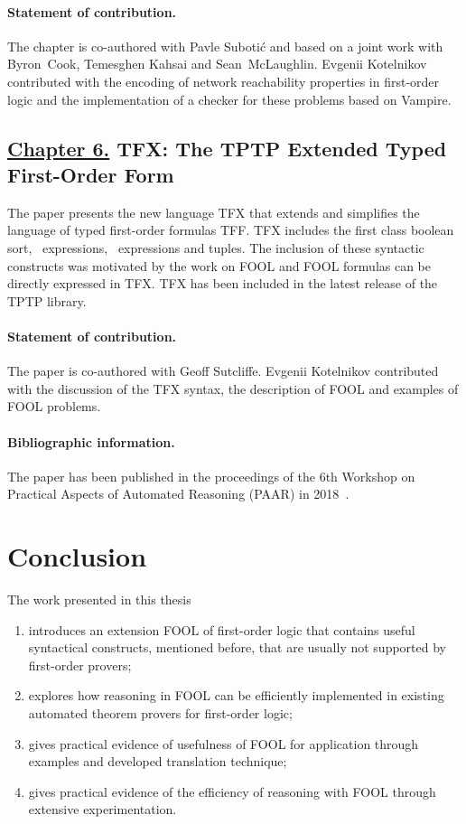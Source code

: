\paragraph{Statement of contribution.} The chapter is co-authored with Pavle Suboti\'{c} and based on a joint work with Byron~Cook, Temesghen Kahsai and Sean~McLaughlin. Evgenii Kotelnikov contributed with the encoding of network reachability properties in first-order logic and the implementation of a checker for these problems based on Vampire.

\subsection*{\hyperref[chap:tfx]{Chapter 6.} TFX: The TPTP Extended Typed First-Order Form}
The paper presents the new language TFX that extends and simplifies the language of typed first-order formulas TFF. TFX includes the first class boolean sort, \ITE\ expressions, \LETIN\ expressions and tuples. The inclusion of these syntactic constructs was motivated by the work on FOOL and FOOL formulas can be directly expressed in TFX. TFX has been included in the latest release of the TPTP library.

\paragraph{Statement of contribution.} The paper is co-authored with Geoff Sutcliffe. Evgenii Kotelnikov contributed with the discussion of the TFX syntax, the description of FOOL and examples of FOOL problems.

\paragraph{Bibliographic information.} The paper has been published in the proceedings of the 6th Workshop on Practical Aspects of Automated Reasoning (PAAR) in 2018~\cite{SutcliffeK18}.

\section*{Conclusion}
The work presented in this thesis
\begin{enumerate}
  \item introduces an extension FOOL of first-order logic that contains useful syntactical constructs, mentioned before, that are usually not supported by first-order provers;
  \item explores how reasoning in FOOL can be efficiently implemented in existing automated theorem provers for first-order logic;
  \item gives practical evidence of usefulness of FOOL for application through examples and developed translation technique;
  \item gives practical evidence of the efficiency of reasoning with FOOL through extensive experimentation.
\end{enumerate}

